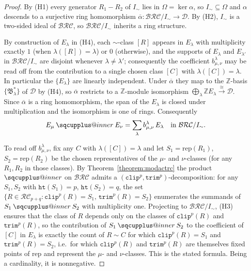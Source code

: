 \documentclass{amsart}
\makeatletter
\newcommand{\sqcupplus@inner}[2]{%
  \vcenter{\hbox{\ooalign{%
    \hfil$\m@th#1\sqcup$\hfil\cr
    \hfil\raisebox{0.15ex}{$\m@th#1\scriptscriptstyle+$}\hfil\cr
  }}}%
}
\newcommand{\sqcupplus}{\mathbin{\mathpalette\sqcupplus@inner\relax}}
\theoremstyle{definition}
\theoremstyle{remark}
\numberwithin{equation}{subsection}
\newcommand{\trm}{\mathtt{trim}}
\newcommand{\hr}{\mathtt{ht}}
\newcommand{\clp}{\mathtt{clip}}
\newcommand{\BRC}{\mathcal{BRC}}
\newcommand{\RC}{\mathcal{RC}}
\newcommand{\dcoma}{\mathcal{D}}
\makeatother
\begin{document}
\begin{proof}
By (H1) every generator $R_1-R_2$ of $I_\sim$ lies in $\Omega=\ker\alpha$, so $I_\sim\subseteq\Omega$ and $\alpha$ descends to a surjective ring homomorphism $\overline\alpha:\BRC/I_\sim\to\dcoma$. By (H2), $I_\sim$ is a two-sided ideal of $\BRC$, so $\BRC/I_\sim$ inherits a ring structure.

By construction of $E_\lambda$ in (H4), each $\sim$-class $[R]$ appears in $E_\lambda$ with multiplicity exactly $1$ (when $\lambda([R])=\lambda$) or $0$ (otherwise), and the supports of $E_\lambda$ and $E_{\lambda'}$ in $\BRC/I_\sim$ are disjoint whenever $\lambda\neq\lambda'$; consequently the coefficient $b_{\mu,\nu}^\lambda$ may be read off from the contribution to a single chosen class $[C]$ with $\lambda([C])=\lambda$. In particular the $\{E_\lambda\}$ are linearly independent. Under $\overline\alpha$ they map to the $\mathbb{Z}$-basis $\{\mathfrak{B}_\lambda^*\}$ of $\dcoma$ by (H4), so $\overline\alpha$ restricts to a $\mathbb{Z}$-module isomorphism $\bigoplus_\lambda\mathbb{Z}E_\lambda\xrightarrow{\;\cong\;}\dcoma$. Since $\overline\alpha$ is a ring homomorphism, the span of the $E_\lambda$ is closed under multiplication and the isomorphism is one of rings. Consequently
$$E_\mu \sqcupplus E_\nu = \sum_\lambda b_{\mu,\nu}^\lambda\, E_\lambda \quad\text{in } \BRC/I_\sim.$$

To read off $b_{\mu,\nu}^\lambda$, fix any $C$ with $\lambda([C])=\lambda$ and let $S_1=\mathrm{rep}(R_1)$, $S_2=\mathrm{rep}(R_2)$ be the chosen representatives of the $\mu$- and $\nu$-classes (for any $R_1,R_2$ in those classes). By Theorem~\ref{theorem:modactrc} the product $\sqcupplus$ on $\BRC$ admits a $(\clp^p,\trm^p)$-decomposition: for any $S_1,S_2$ with $\hr(S_1)=p$, $\hr(S_2)=q$, the set $\{R\in\RC_{p+q}:\clp^p(R)=S_1,\,\trm^p(R)=S_2\}$ enumerates the summands of $S_1\sqcupplus S_2$ with multiplicity one. Projecting to $\BRC/I_\sim$, (H3) ensures that the class of $R$ depends only on the classes of $\clp^p(R)$ and $\trm^p(R)$, so the contribution of $S_1\sqcupplus S_2$ to the coefficient of $[C]$ in $E_\lambda$ is exactly the count of $R\sim C$ for which $\clp^p(R)=S_1$ and $\trm^p(R)=S_2$, i.e.\ for which $\clp^p(R)$ and $\trm^p(R)$ are themselves fixed points of $\mathrm{rep}$ and represent the $\mu$- and $\nu$-classes. This is the stated formula. Being a cardinality, it is nonnegative.


\end{proof}
\end{document}
